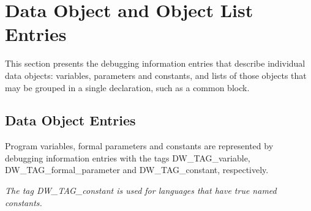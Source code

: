 \chapter[Data Object and Object List]{Data Object and Object List Entries}
\label{chap:dataobjectandobjectlistentries}

This section presents the debugging information entries that
describe individual data objects: variables, parameters and
constants, and lists of those objects that may be grouped in
a single declaration, such as a common block.

\section{Data Object Entries}
\label{chap:dataobjectentries}


Program variables, formal parameters and constants are
represented by debugging information entries with the tags
DW\_TAG\_variable, DW\_TAG\_formal\_parameter and DW\_TAG\_constant,
respectively.

\textit{The tag DW\_TAG\_constant is used for languages that
have true named constants.}

